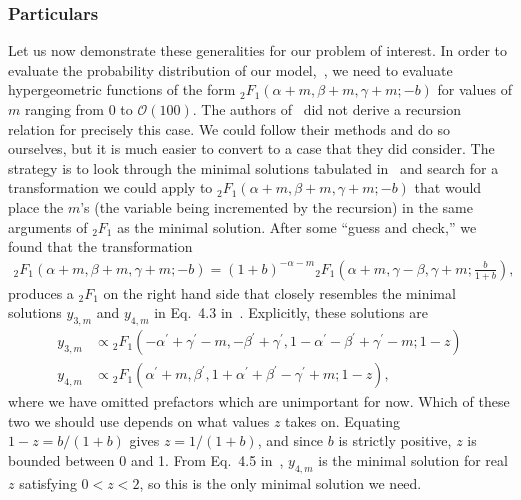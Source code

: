 \subsubsection{Particulars}
Let us now demonstrate these generalities for our problem of interest.
In order to evaluate the probability distribution of our
model,~, we need to evaluate hypergeometric functions
of the form ${_2F_1}(\alpha+m, \beta+m, \gamma+m; -b)$
for values of $m$ ranging from $0$ to $\mathcal{O}(100)$.
The authors of~\cite{Gil2007} did not derive a recursion relation
for precisely this case. We could follow their methods and do so ourselves,
but it is much easier to convert to a case that they did consider.
The strategy is to look through the minimal solutions tabulated
in~\cite{Gil2007} and search for a transformation we could apply to
${_2F_1}(\alpha+m, \beta+m, \gamma+m; -b)$ that would place the $m$'s
(the variable being incremented by the recursion)
in the same arguments of ${_2F_1}$ as the minimal solution.
After some ``guess and check,'' we found that the transformation
\begin{align}
{_2F_1}(\alpha+m, \beta+m, \gamma+m; -b)
=
(1+b)^{-\alpha-m}
        {_2F_1}\left(\alpha+m, \gamma-\beta, \gamma+m; \frac{b}{1+b}\right),
\label{eq:rec_euler_pretransform}
\end{align}
produces a ${_2F_1}$ on the right hand side that closely resembles
the minimal solutions $y_{3,m}$ and $y_{4,m}$ in Eq.~4.3 in~\cite{Gil2007}.
Explicitly, these solutions are
\begin{align}
y_{3,m}
&\propto
{_2F_1}\left(-\alpha^\prime + \gamma^\prime - m,
                -\beta^\prime + \gamma^\prime,
                1-\alpha^\prime-\beta^\prime+\gamma^\prime-m;
                1-z\right)
\\
y_{4,m}
&\propto
{_2F_1}\left(\alpha^\prime + m,
                \beta^\prime,
                1+\alpha^\prime+\beta^\prime-\gamma^\prime+m;
                1-z\right),
\label{eq:minimal_soln_sans_prefac}
\end{align}
where we have omitted prefactors which are unimportant for now.
Which of these two we should use depends on what values $z$ takes on.
Equating $1-z=b/(1+b)$ gives $z=1/(1+b)$, and since $b$ is strictly positive,
$z$ is bounded between 0 and 1.
From Eq.~4.5 in~\cite{Gil2007}, $y_{4,m}$ is the minimal solution
for real $z$ satisfying $0<z<2$, so this is the only minimal solution we need.

